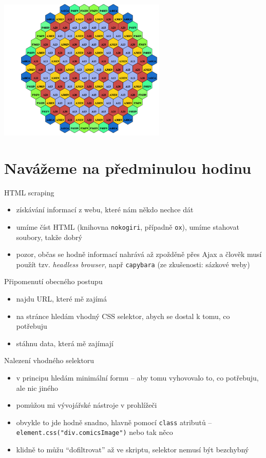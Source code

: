 \documentclass{beamer}
\begin{document}
\begin{frame}{}
  \begin{center}
    \includegraphics[width=0.6\textwidth]{kartogram}    
  \end{center}
\end{frame}

\section{Navážeme na předminulou hodinu}

\begin{frame}{HTML scraping}
  \begin{itemize}
    \item získávání informací z webu, které nám někdo nechce dát
    \item umíme číst HTML (knihovna \texttt{nokogiri}, případně \texttt{ox}), umíme stahovat soubory, takže dobrý
    \item pozor, občas se hodně informací nahrává až zpožděně přes Ajax a člověk musí použít tzv. \emph{headless browser}, např \texttt{capybara} (ze zkušenosti: sázkové weby) 
  \end{itemize}
\end{frame}

\begin{frame}{Připomenutí obecného postupu}
  \begin{itemize}
    \item najdu URL, které mě zajímá
    \item na stránce hledám vhodný CSS selektor, abych se dostal k tomu, co potřebuju
    \item stáhnu data, která mě zajímají
  \end{itemize}
\end{frame}

\begin{frame}{Nalezení vhodného selektoru}
  \begin{itemize}
    \item v principu hledám minimální formu -- aby tomu vyhovovalo to, co potřebuju, ale nic jiného
    \item pomůžou mi vývojářské nástroje v prohlížeči
    \item obvykle to jde hodně snadno, hlavně pomocí \texttt{class} atributů -- \texttt{element.css("div.comicsImage")} nebo tak něco
    \item klidně to můžu ``dofiltrovat'' až ve skriptu, selektor nemusí být bezchybný 
  \end{itemize}
\end{frame}
\end{document}
